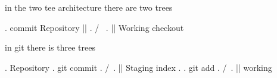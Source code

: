 in the two tee architecture there are two trees 

.     commit      Repository      || 
.      /\                         \/
.      ||          Working     checkout



in git there is three trees 

.              Repository 
.  git commit
.   /\
.   ||         Staging index  
.
.  git add 
.    /\
.    ||        working 

